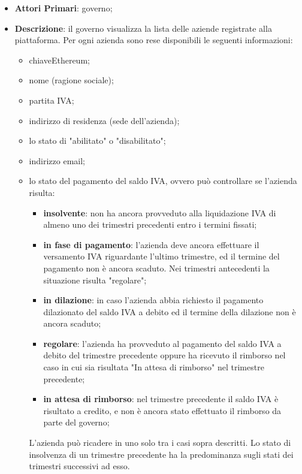  \begin{itemize}
	\item \textbf{Attori Primari}: governo;
	\item \textbf{Descrizione}: il governo visualizza la lista delle aziende registrate alla piattaforma. Per ogni azienda sono rese disponibili le seguenti informazioni:
	\begin{itemize}
		\item chiave\glosp Ethereum\glo;
		\item nome (ragione sociale);
		\item partita IVA;
		\item indirizzo di residenza (sede dell'azienda);
		\item lo stato di "abilitato" o "disabilitato";
		\item indirizzo email;
		\item lo stato del pagamento del saldo IVA, ovvero può controllare se l'azienda risulta:
		\begin{itemize}
			\item \textbf{insolvente}: non ha ancora provveduto alla liquidazione IVA di almeno uno dei trimestri precedenti entro i termini fissati;
			\item \textbf{in fase di pagamento}: l'azienda deve ancora effettuare il versamento IVA riguardante l'ultimo trimestre, ed il termine del pagamento non è ancora scaduto. Nei trimestri antecedenti la situazione risulta "regolare";
			\item \textbf{in dilazione}: in caso l'azienda abbia richiesto il pagamento dilazionato del saldo IVA a debito ed il termine della dilazione non è ancora scaduto;
			\item \textbf{regolare}: l'azienda ha provveduto al pagamento del saldo IVA a debito del trimestre precedente oppure ha ricevuto il rimborso nel caso in cui sia risultata "In attesa di rimborso" nel trimestre precedente;
			\item \textbf{in attesa di rimborso}: nel trimestre precedente il saldo IVA è risultato a credito, e non è ancora stato effettuato il rimborso da parte del governo;
		\end{itemize}
	L'azienda può ricadere in uno solo tra i casi sopra descritti. Lo stato di insolvenza di un trimestre precedente ha la predominanza sugli stati dei trimestri successivi ad esso.
	\end{itemize}
	

\end{itemize}
